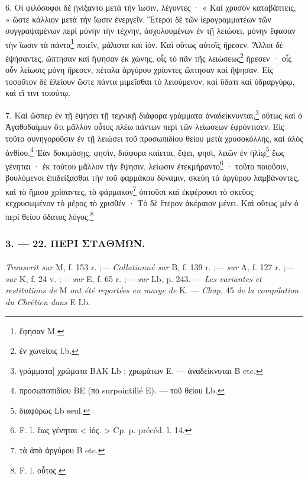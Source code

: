 \documentclass[landscape, a4paper, 11pt, oneside, polutonikogreek, french]{article}
\begin{document}
6. Οἱ φιλόσοφοι δὲ ᾐνίξαντο μετὰ τὴν ἴωσιν, λέγοντες · « Καὶ χρυσὸν καταβάπτεις, » ὥστε κάλλιον μετὰ τὴν ἴωσιν ἐνεργεῖν. Ἕτεροι δὲ τῶν ἱερογραμματέων τῶν συγγραψαμένων περὶ μόνην τὴν τέχνην, ἀσχολουμένων ἐν τῇ λειώσει, μόνην ἔφασαν τὴν ἴωσιν τὰ πάντα\footnote{ἔφησαν M.} ποιεῖν, μάλιστα καὶ ἰόν. Καὶ οὕτως αὐτοῖς ἤρεσεν. Ἄλλοι δὲ ἑψήσαντες, ὤπτησαν καὶ ἥψησαν ἐκ χώνης, οἷς τὸ πᾶν τῆς λειώσεως\footnote{ἐν χωνείοις l.b.} ἤρεσεν · οἷς οὖν λείωσις μόνη ἤρεσεν, πέταλα ἀργύρου χρίοντες ὤπτησαν καὶ ἥψησαν. Εἰς τοσοῦτον δὲ ἐλείουν ὥστε πάντα μιμεῖσθαι τὸ λειούμενον, καὶ ὕδατι καὶ ὑδραργύρῳ, καὶ εἴ τινι τοιούτῳ.

7. Καὶ ὥσπερ ἐν τῇ ἑψήσει τῇ τεχνικῇ διάφορα γράμματα ἀναδείκνυνται,\footnote{γράμματα] χρώματα BAK Lb ; χρωμάτων E. --- ἀναδείκνυται B etc.} οὕτως καὶ ὁ Ἀγαθοδαίμων ὅτι μᾶλλον οὗτος πλέω πάντων περὶ τῶν λείωσεων ἐφρόντισεν. Εἰς τοῦτο συνηγοροῦσιν ἐν τῇ λειώσει τοῦ προσωπιδίου θείου μετὰ χρυσοκόλλης, καὶ ἀλὸς ἀνθίου.\footnote{προσωποπιδίου BE (πο surpointillé E). --- τοῦ θείου Lb.} Ἐὰν δοκιμάσῃς, φησὶν, διάφορα καίεται, ἕψει, φησὶ, λειῶν ἐν ἡλίῳ\footnote{διαφόρως Lb seul.} ἕως γένηται · ἐκ τούτου μᾶλλον τὴν ἕψησιν, λείωσιν ἐτεκμήραντο\footnote{F. l. ἕως γένηται < ἰός. > Cp. p. précéd. l. 14.} · τοῦτο ποιοῦσιν, βουλόμενοι ἐπιδείξασθαι τὴν τοῦ φαρμάκου δύναμιν, σκεύη τὰ ἀργύρου λαμβάνοντες, καὶ τὸ ἥμισυ χρίσαντες, τὸ φάρμακον\footnote{τὰ ἀπὸ ἀργύρου B etc.} ὀπτοῦσι καὶ ἐκφέρουσι τὸ σκεῦος κεχρυσωμένον τὸ μέρος τὸ χρισθέν · Τὸ δὲ ἕτερον ἀκέραιον μένει. Καὶ οὕτως μὲν ὁ περί θείου ὕδατος λόγος.\footnote{F. l. οὗτος.}

\bigskip
\centerline{\EightStarTaper}
\centerline{\EightStarTaper\EightStarTaper}
\bigskip

\subsubsection{3. --- 22. ΠΕΡΙ ΣΤΑΘΜΩΝ.}
\paragraph{}
\emph{Transcrit sur} M, f. 153 r. ;--- \emph{Collationné sur} B, f. 139 r. ;--- \emph{sur} A, f. 127 r. ;--- \emph{sur} K, f. 24 v. ;--- \emph{sur} E, f. 65 r. ;--- \emph{sur} Lb, p. 243. --- \emph{Les variantes et restitutions de} M \emph{ont été reportées en marge de} K. --- \emph{Chap.} 45 \emph{de la compilation du Chrétien dans} E Lb.

\bigskip
\end{document}
